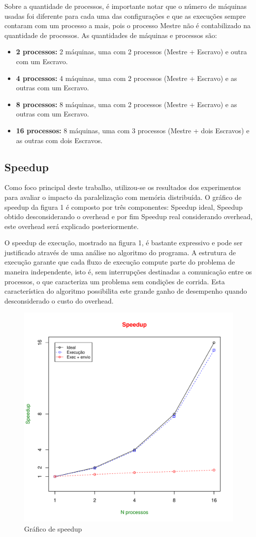 \documentclass[12pt]{article}
\begin{document}
Sobre a quantidade de processos, é importante notar que o número de máquinas usadas foi diferente para cada uma das configurações e que as execuções sempre contaram com um processo a mais, pois o processo Mestre não é contabilizado na quantidade de processos. As quantidades de máquinas e processos são: 
\begin{itemize}
\item \textbf{2 processos:} 2 máquinas, uma com 2 processos (Mestre + Escravo) e outra com um Escravo.
\item \textbf{4 processos:} 4 máquinas, uma com 2 processos (Mestre + Escravo) e as outras com um Escravo.
\item \textbf{8 processos:} 8 máquinas, uma com 2 processos (Mestre + Escravo) e as outras com um Escravo.
\item \textbf{16 processos:} 8 máquinas, uma com 3 processos (Mestre + dois Escravos) e as outras com dois Escravos. 
\end{itemize}

\subsection{Speedup}
Como foco principal deste trabalho, utilizou-se os resultados dos experimentos para avaliar o impacto da paralelização com memória distribuída. O gráfico de speedup da figura 1 é composto por três componentes: Speedup ideal, Speedup obtido desconsiderando o overhead e por fim Speedup real considerando overhead, este overhead será explicado posteriormente.

O speedup de execução, mostrado na figura 1, é bastante expressivo e pode ser justificado através de uma análise no algoritmo do programa. A estrutura de execução garante que cada fluxo de execução compute parte do problema de maneira independente, isto é, sem interrupções destinadas a comunicação entre os processos, o que caracteriza um problema sem condições de corrida. Esta característica do algoritmo possibilita este grande ganho de desempenho quando desconsiderado o custo do overhead.   

\begin{figure}[ht!]
\centering
\includegraphics[width=.6\textwidth]{sp.pdf}
\caption{Gráfico de speedup}
\label{fig:exampleFig1}
\end{figure}
\end{document}
